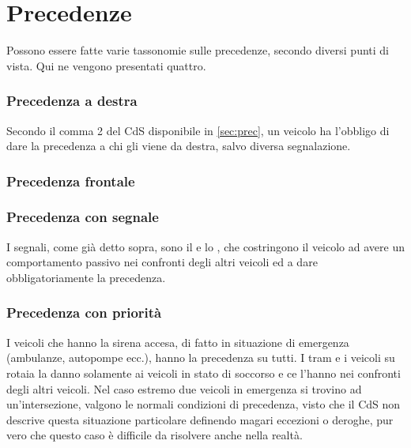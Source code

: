 \section{Precedenze}
Possono essere fatte varie tassonomie sulle precedenze, secondo diversi punti di vista. Qui ne vengono presentati quattro.
\subsubsection{Precedenza a destra}
Secondo il comma 2 del CdS disponibile in \ref{sec:prec}, un veicolo ha l'obbligo di dare la precedenza a chi gli viene da destra, salvo diversa segnalazione.

\subsubsection{Precedenza frontale}

\subsubsection{Precedenza con segnale}
I segnali, come già detto sopra, sono il  e lo , che costringono il veicolo ad avere un comportamento passivo nei confronti degli altri veicoli ed a dare obbligatoriamente la precedenza.

\subsubsection{Precedenza con priorità}
I veicoli che hanno la sirena accesa, di fatto in situazione di emergenza (ambulanze, autopompe ecc.), hanno la precedenza su tutti. I tram e i veicoli su rotaia la danno solamente ai veicoli in stato di soccorso e ce l'hanno nei confronti degli altri veicoli. Nel caso estremo due veicoli in emergenza si trovino ad un'intersezione, valgono le normali condizioni di precedenza, visto che il CdS non descrive questa situazione particolare definendo magari eccezioni o deroghe, pur vero che questo caso è difficile da risolvere anche nella realtà.


